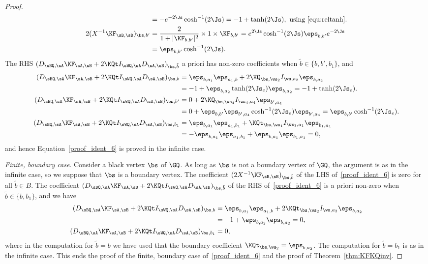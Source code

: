 \documentclass[a4paper,twoside,11pt]{article}
\begin{document}
\begin{proof}
\begin{align*}
&=-e^{-2\Js}\cosh^{-1}(2\Js)=-1+\tanh(2\Js),\text{ using~\eqref{equ:reltanh}}.\\
2(X^{-1}\KF_{\sB,\sB})_{\bs,b'}&=\frac{2}{1+|\KF_{b,b'}|^2}\times 1\times \KF_{b,b'}=e^{2\Js}\cosh^{-1}(2\Js)\eps_{b,b'}e^{-2\Js}\\
&=\eps_{b,b'}\cosh^{-1}(2\Js).
\end{align*}
The RHS $(D_{\sBQ,\sA}\KF_{\sA,\sB}+2 \KQt I_{\sWQ,\sA}D_{\sA,\sB})_{\bs,\tilde{b}}$ a priori has non-zero coefficients when 
$\tilde{b}\in\{b,b',b_1\}$, and
\begin{align*}
(D_{\sBQ,\sA}\KF_{\sA,\sB}+2 \KQt I_{\sWQ,\sA}D_{\sA,\sB})_{\bs,b}&=
\eps_{b,a_1}\eps_{a_1,b}+2\KQ_{\bs,\ws_2}I_{\ws,a_2}\eps_{b,a_2}\\
&=-1+\eps_{b,a_2}\tanh(2\Js_e)\eps_{b,a_2}
=-1+\tanh(2\Js_e).\\
(D_{\sBQ,\sA}\KF_{\sA,\sB}+2 \KQt I_{\sWQ,\sA}D_{\sA,\sB})_{\bs,b'}&=0+2\KQ_{\bs,\ws_4}I_{\ws_4,a_4}\eps_{b',a_4}\\
&=0+\eps_{b,b'}\eps_{b',a_4}\cosh^{-1}(2\Js_e) \eps_{b',a_4}=\eps_{b,b'}\cosh^{-1}(2\Js_e).\\
(D_{\sBQ,\sA}\KF_{\sA,\sB}+2 \KQt I_{\sWQ,\sA}D_{\sA,\sB})_{\bs,b_1}&=
\eps_{b,a_1}\eps_{a_1,b_1}+\KQt_{\bs,\ws_1}I_{\ws_1,a_1}\eps_{b_1,a_1}\\
&=-\eps_{b,a_1}\eps_{a_1,b_1}+\eps_{b,a_1}\eps_{b_1,a_1}=0,
\end{align*}
and hence Equation~\eqref{proof_ident_6} is proved in the infinite case.

\emph{Finite, boundary case}. Consider a black vertex $\bs$ of $\GQ$. 
As long as $\bs$ is not a boundary vertex of $\GQ$, the argument is as in the infinite case, so
we suppose that $\bs$ is a boundary vertex. The coefficient $(2X^{-1}\KF_{\sB,\sB})_{\bs,\tilde{b}}$ of the LHS of~\eqref{proof_ident_6}
is zero for all $\tilde{b}\in B$. The coefficient 
$(D_{\sBQ,\sA}\KF_{\sA,\sB}+2 \KQt I_{\sWQ,\sA}D_{\sA,\sB})_{\bs,\tilde{b}}$ of the RHS of~\eqref{proof_ident_6}
is a priori non-zero when $\tilde{b}\in\{b,b_1\}$, and we have
\begin{align*}
(D_{\sBQ,\sA}\KF_{\sA,\sB}+2 \KQt I_{\sWQ,\sA}D_{\sA,\sB})_{\bs,b}&=
\eps_{b,a_1}\eps_{a_1,b}+2\KQt_{\bs,\ws_2}I_{\ws,a_2}\eps_{b,a_2}\\
&=-1+\eps_{b,a_2}\eps_{b,a_2}=0,\\
(D_{\sBQ,\sA}\KF_{\sA,\sB}+2 \KQt I_{\sWQ,\sA}D_{\sA,\sB})_{\bs,b_1}&=0,
\end{align*}
where in the computation for $\tilde{b}=b$ we have used that the boundary coefficient $\KQt_{\bs,\ws_2}=\eps_{b,a_2}$. 
The computation for $\tilde{b}=b_1$
is as in the infinite case. This ends the proof of the finite, boundary case of~\eqref{proof_ident_6} and the proof of 
Theorem~\ref{thm:KFKQinv}.
\end{proof}
\end{document}
